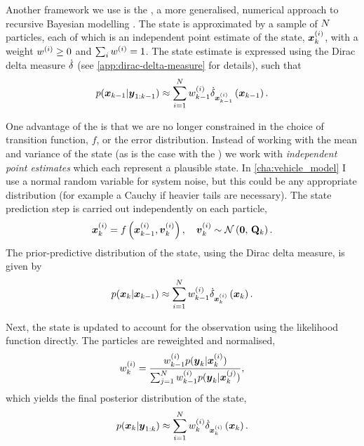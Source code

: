 Another framework we use is the \pf{}, a more generalised, numerical approach to recursive Bayesian modelling \citep{Gordon_1993}. The state is approximated by a sample of $N$ particles, each of which is an independent point estimate of the state, $\boldsymbol x^{(i)}_k$, with a weight $w^{(i)} \geq 0$ and $\sum_i w^{(i)} = 1$. The state estimate is expressed using the Dirac delta measure $\dot\delta$ (see \cref{app:dirac-delta-measure} for details), such that
\begin{equation}
\label{eq:pf_state}
p(\bx_{k-1} | \boldsymbol{y}_{1:k-1}) \approx
\sum_{i=1}^\Np w\vi_{k-1} \DiracMeasure{\bx\vi_{k-1}}{\bx_{k-1}}.
\end{equation}

One advantage of the \pf{} is that we are no longer constrained in the choice of transition function, $f$, or the error distribution. Instead of working with the mean and variance of the state (as is the case with the \kf{}) we work with \emph{independent point estimates} which each represent a plausible state. In \cref{cha:vehicle_model} I use a normal random variable for system noise, but this could be any appropriate distribution (for example a Cauchy if heavier tails are necessary). The state prediction step is carried out independently on each particle,
\begin{equation}
\label{eq:ch2:pf_predict_particle}
\bx\vi_k = f\left(\bx\vi_{k-1}, \boldsymbol{v}\vi_k\right),
\quad
\boldsymbol{v}\vi_k \sim \Normal{\boldsymbol{0}}{\mat{Q}_k}.
\end{equation}
The prior-predictive distribution of the state, using the Dirac delta measure, is given by
\begin{equation}
\label{eq:ch2:pf_predict_state}
p(\bx_k | \bx_{k-1}) \approx
\sum_{i=1}^\Np w\vi_{k-1} \DiracMeasure{\bx\vi_k}{\bx_k}.
\end{equation}


Next, the state is updated to account for the observation using the likelihood function directly. The particles are reweighted and normalised,
\begin{equation}
\label{eq:pf_reweight}
w\vi_k =
\frac{
    w\vi_{k-1} p(\boldsymbol{y}_k | \bx\vi_k)
}{
    \sum_{j=1}^\Np w\vi_{k-1} p(\boldsymbol{y}_k | \bx\vi[j]_k)
},
\end{equation}
which yields the final posterior distribution of the state,
\begin{equation}
\label{eq:pf_state_post}
p(\bx_{k} | \boldsymbol{y}_{1:k}) \approx
\sum_{i=1}^\Np w\vi_{k} \DiracMeasure{\bx\vi_{k}}{\bx_{k}}.
\end{equation}


